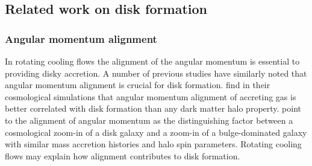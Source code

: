 \documentclass[fleqn,usenatbib]{mnras}
\begin{document}


\subsection{Related work on disk formation}
\label{s: other disk formation}

\subsubsection{Angular momentum alignment}
\label{s: other disk formation -- alignment}

In rotating cooling flows the alignment of the angular momentum is essential to providing disky accretion.
A number of previous studies have similarly noted that angular momentum alignment is crucial for disk formation.
\cite{Sales2012} find in their cosmological simulations that angular momentum alignment of accreting gas is better correlated with disk formation than any dark matter halo property.
\cite{Kretschmer2020} point to the alignment of angular momentum as the distinguishing factor between a cosmological zoom-in of a disk galaxy and a zoom-in of a bulge-dominated galaxy with similar mass accretion histories and halo spin parameters.
Rotating cooling flows may explain how alignment contributes to disk formation.
\end{document}
